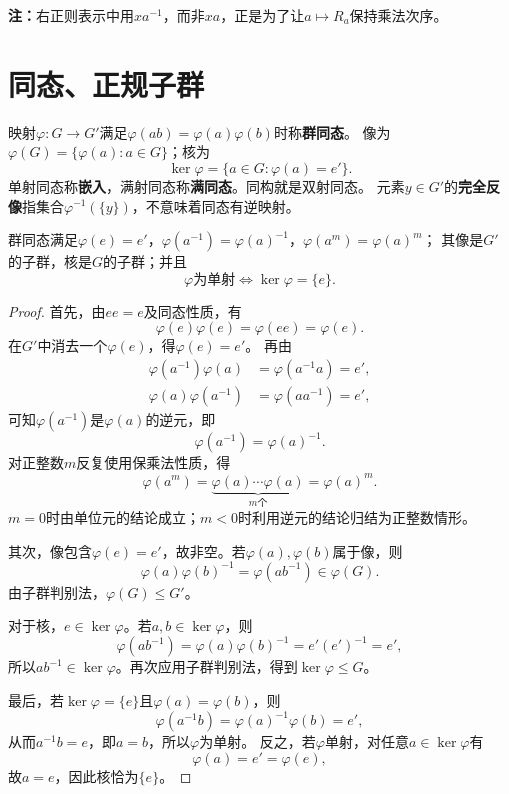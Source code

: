 \textbf{注：}右正则表示中用$xa^{-1}$，而非$xa$，正是为了让$a\mapsto R_a$保持乘法次序。


\section{同态、正规子群}
\begin{definition}
映射$\varphi:G\to G'$满足$\varphi(ab)=\varphi(a)\varphi(b)$时称\textbf{群同态}。
像为$\varphi(G)=\{\varphi(a):a\in G\}$；核为
\[
\ker\varphi=\{a\in G:\varphi(a)=e'\}.
\]
单射同态称\textbf{嵌入}，满射同态称\textbf{满同态}。同构就是双射同态。
元素$y\in G'$的\textbf{完全反像}指集合$\varphi^{-1}(\{y\})$，不意味着同态有逆映射。
\end{definition}

\begin{proposition}
群同态满足$\varphi(e)=e'$，$\varphi(a^{-1})=\varphi(a)^{-1}$，$\varphi(a^m)=\varphi(a)^m$；
其像是$G'$的子群，核是$G$的子群；并且
\[
\varphi\text{为单射}\iff\ker\varphi=\{e\}.
\]
\end{proposition}
\begin{proof}
首先，由$ee=e$及同态性质，有
\[
\varphi(e)\varphi(e)=\varphi(ee)=\varphi(e).
\]
在$G'$中消去一个$\varphi(e)$，得$\varphi(e)=e'$。
再由
\[
\begin{aligned}
\varphi(a^{-1})\varphi(a)&=\varphi(a^{-1}a)=e',\\
\varphi(a)\varphi(a^{-1})&=\varphi(aa^{-1})=e',
\end{aligned}
\]
可知$\varphi(a^{-1})$是$\varphi(a)$的逆元，即
\[
\varphi(a^{-1})=\varphi(a)^{-1}.
\]
对正整数$m$反复使用保乘法性质，得
\[
\varphi(a^m)=\underbrace{\varphi(a)\cdots\varphi(a)}_{m\text{个}}=\varphi(a)^m.
\]
$m=0$时由单位元的结论成立；$m<0$时利用逆元的结论归结为正整数情形。

其次，像包含$\varphi(e)=e'$，故非空。若$\varphi(a),\varphi(b)$属于像，则
\[
\varphi(a)\varphi(b)^{-1}=\varphi(ab^{-1})\in\varphi(G).
\]
由子群判别法，$\varphi(G)\leq G'$。

对于核，$e\in\ker\varphi$。若$a,b\in\ker\varphi$，则
\[
\varphi(ab^{-1})=\varphi(a)\varphi(b)^{-1}=e'(e')^{-1}=e',
\]
所以$ab^{-1}\in\ker\varphi$。再次应用子群判别法，得到$\ker\varphi\leq G$。

最后，若$\ker\varphi=\{e\}$且$\varphi(a)=\varphi(b)$，则
\[
\varphi(a^{-1}b)=\varphi(a)^{-1}\varphi(b)=e',
\]
从而$a^{-1}b=e$，即$a=b$，所以$\varphi$为单射。
反之，若$\varphi$单射，对任意$a\in\ker\varphi$有
\[
\varphi(a)=e'=\varphi(e),
\]
故$a=e$，因此核恰为$\{e\}$。
\end{proof}


